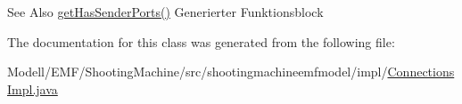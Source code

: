 \begin{DoxySeeAlso}{See Also}
\hyperlink{classshootingmachineemfmodel_1_1impl_1_1_connections_impl_ae75288578dc15b4f66454ee96b23ed0b}{get\-Has\-Sender\-Ports()} Generierter Funktionsblock  
\end{DoxySeeAlso}


The documentation for this class was generated from the following file\-:\begin{DoxyCompactItemize}
\item 
Modell/\-E\-M\-F/\-Shooting\-Machine/src/shootingmachineemfmodel/impl/\hyperlink{_connections_impl_8java}{Connections\-Impl.\-java}\end{DoxyCompactItemize}

